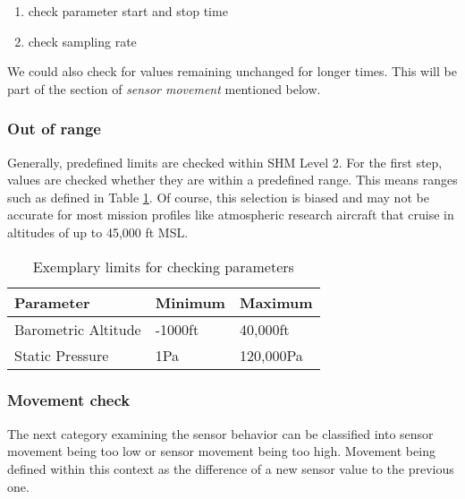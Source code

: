 \begin{enumerate}
    \item check parameter start and stop time
    \item check sampling rate
\end{enumerate}

We could also check for values remaining unchanged for longer times. This will be part of the section of \textit{sensor movement} mentioned below.

\subsubsection{Out of range}
Generally, predefined limits are checked within SHM Level 2. For the first step, values are checked whether they are within a predefined range. This means ranges such as defined in Table \ref{tab:level_2_range}. Of course, this selection is biased and may not be accurate for most mission profiles like atmospheric research aircraft that cruise in altitudes of up to 45,000 ft MSL.

\begin{table}[]
    \centering
    \begin{tabular}{@{}lll@{}}
        \toprule
        Parameter           & Minimum & Maximum   \\ \midrule
        Barometric Altitude & -1000ft & 40,000ft  \\
        Static Pressure     & 1Pa     & 120,000Pa \\ \bottomrule
    \end{tabular}
    \caption{Exemplary limits for checking parameters}
    \label{tab:level_2_range}
\end{table}

\subsubsection{Movement check}
\label{chap:4-level_2_movement}
The next category examining the sensor behavior can be classified into sensor movement being too low or sensor movement being too high. Movement being defined within this context as the difference of a new sensor value to the previous one.

